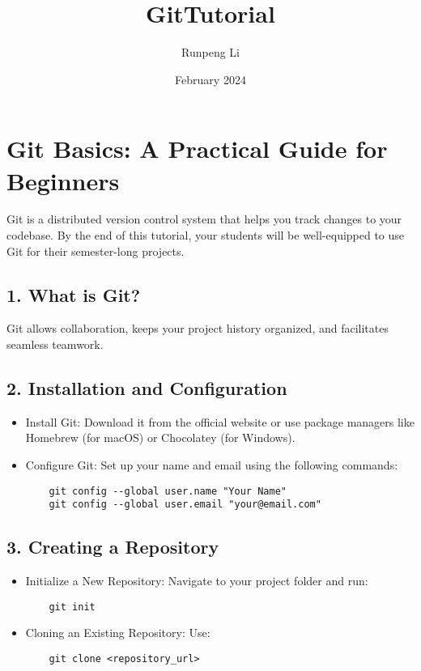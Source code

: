 \documentclass{article}
\title{GitTutorial}
\author{Runpeng Li}
\date{February 2024}
\begin{document}
\maketitle

\section*{Git Basics: A Practical Guide for Beginners}

Git is a distributed version control system that helps you track changes to your codebase. By the end of this tutorial, your students will be well-equipped to use Git for their semester-long projects.

\subsection*{1. What is Git?}
Git allows collaboration, keeps your project history organized, and facilitates seamless teamwork.

\subsection*{2. Installation and Configuration}
\begin{itemize}
    \item Install Git: Download it from the official website or use package managers like Homebrew (for macOS) or Chocolatey (for Windows).
    \item Configure Git: Set up your name and email using the following commands:
    \begin{verbatim}
    git config --global user.name "Your Name"
    git config --global user.email "your@email.com"
    \end{verbatim}
\end{itemize}

\subsection*{3. Creating a Repository}
\begin{itemize}
    \item Initialize a New Repository: Navigate to your project folder and run:
    \begin{verbatim}
    git init
    \end{verbatim}
    \item Cloning an Existing Repository: Use:
    \begin{verbatim}
    git clone <repository_url>
    \end{verbatim}
\end{itemize}
\end{document}
